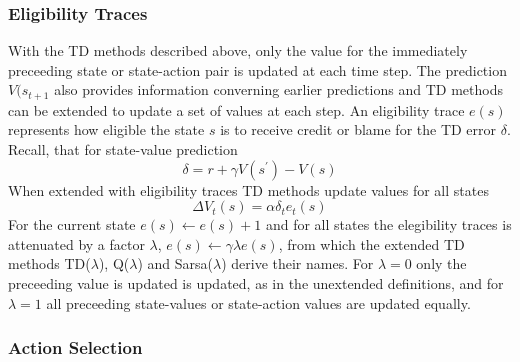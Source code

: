 \subsubsection{Eligibility Traces}
With the TD methods described above, only the value for the immediately
preceeding state or state-action pair is updated at each time step.  The
prediction $V(s_{t+1}$ also provides information converning earlier predictions
and TD methods can be extended to update a set of values at each step.  An
eligibility trace $e(s)$ represents how eligible the state $s$ is to receive
credit or blame for the TD error $\delta$.  Recall, that for state-value
prediction
\begin{equation}
\delta = r + \gamma V(s^\prime) - V(s)
\end{equation}
When extended with eligibility traces TD methods update values for all states
\begin{equation}
\Delta V_t(s) = \alpha \delta_t e_t(s)
\end{equation}
For the current state $e(s) \leftarrow e(s) + 1$ and for all states the
elegibility traces is attenuated by a factor $\lambda$, $e(s) \leftarrow \gamma
\lambda e(s)$, from which the extended TD methods TD($\lambda$), Q($\lambda$)
and Sarsa($\lambda$) derive their names.  For $\lambda = 0$ only the preceeding
value is updated is updated, as in the unextended definitions, and for $\lambda
= 1$ all preceeding state-values or state-action values are updated equally.

\subsubsection{Action Selection}

